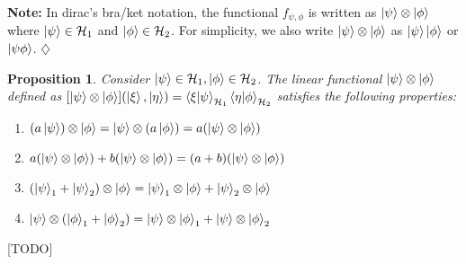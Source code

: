 \documentclass[12pt,twoside,fleqn]{report}
\makeatletter
\theoremstyle{thmstyle}
\renewenvironment{proof}[1][\proofname]{\par
\pushQED{\qed}%
\normalfont \topsep6\p@\@plus6\p@\relax
\trivlist
\item[\hskip\labelsep\itshape#1\@addpunct{.}]\mbox{}\par\nobreak\ignorespaces
}{%
    \popQED\endtrivlist\@endpefalse
    }
\newtheorem{prop}{Proposition}[chapter]
\newenvironment{note}{\textbf{Note:}}{\hfill\ensuremath{\diamondsuit}}
\makeatother
\begin{document}
\begin{note}
    In dirac's bra/ket notation, the functional $f_{\psi,\phi}$ is written as $\ket{\psi} \otimes \ket{\phi}$ where $\ket{\psi} \in \mathcal{H}_1$ and $\ket{\phi} \in \mathcal{H}_2$.
    For simplicity, we also write $\ket{\psi} \otimes \ket{\phi}$ as $\ket{\psi}\ket{\phi}$ or $\ket{\psi\phi}$.
\end{note}


\begin{prop}
    Consider $\ket\psi \in \mathcal{H}_1, \ket\phi \in \mathcal{H}_2$.
    The linear functional $\ket{\psi} \otimes \ket{\phi}$ defined as $[\ket\psi \otimes \ket\phi](\ket\xi,\ket\eta) = \braket{\xi|\psi}_{\mathcal{H}_1}\braket{\eta|\phi}_{\mathcal{H}_2}$  satisfies the following properties:
    \begin{enumerate}
        \item $(a \ket\psi) \otimes \ket\phi = \ket\psi \otimes (a \ket\phi) = a (\ket\psi \otimes \ket\phi)$
        \item $a (\ket\psi \otimes \ket\phi) + b (\ket\psi \otimes \ket\phi) = (a + b) (\ket\psi \otimes \ket\phi)$
        \item $(\ket\psi_1 + \ket\psi_2) \otimes \ket\phi = \ket\psi_1 \otimes \ket\phi + \ket\psi_2 \otimes \ket\phi$
        \item $\ket\psi \otimes (\ket\phi_1 + \ket\phi_2) = \ket\psi \otimes \ket\phi_1 + \ket\psi \otimes \ket\phi_2$
    \end{enumerate}
\end{prop}
\begin{proof}
    [TODO]
\end{proof}
\end{document}

